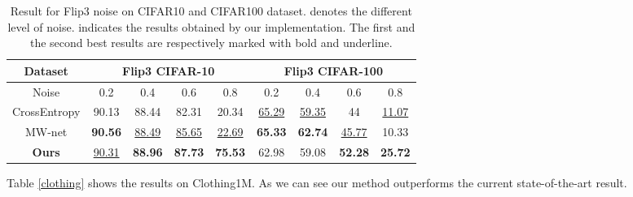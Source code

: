 \documentclass[runningheads]{llncs}
\begin{document}
	\begin{table}[!t]
		\caption{\label{flip3} Result for Flip3 noise on CIFAR10 and CIFAR100 dataset.  denotes the different level of noise.  indicates the results obtained by our implementation. The first and the second best results are respectively marked with bold and underline.}
		\centering
		\begin{tabular}{c|c|c|c|c||c|c|c|c}
			\hline
			Dataset  & \multicolumn{4}{c||}{Flip3 CIFAR-10} & \multicolumn{4}{c}{Flip3 CIFAR-100} \\ \hline
			Noise     & 0.2        & 0.4       & 0.6       & 0.8       & 0.2        & 0.4        & 0.6       & 0.8       \\ \hline
			CrossEntropy  & 90.13      & 88.44     & 82.31    & 20.34 & \underline{65.29}      & \underline{59.35}      & 44      & \underline{11.07}  \\
			MW-net \cite{shu2019meta}   & \textbf{90.56}      & \underline{88.49}     & \underline{85.65}  &\underline{22.69}   & \textbf{65.33}      & \textbf{62.74}      & \underline{45.77}  &10.33   \\ \hline
			\textbf{Ours}     & \underline{90.31}      & \textbf{88.96}     & \textbf{87.73}    & \textbf{75.53} & 62.98      & 59.08      & \textbf{52.28}   &\textbf{25.72}  \\ \hline
		\end{tabular}
	\end{table}
	
	
	Table \ref{clothing} shows the results on Clothing1M. As we can see our method outperforms the current state-of-the-art result.
	
\end{document}
